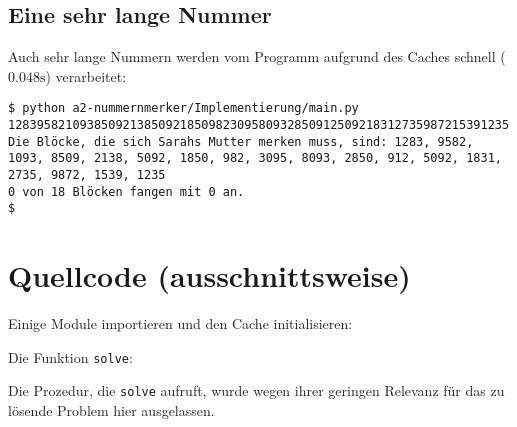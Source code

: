 \documentclass[a4paper,10pt,ngerman]{scrartcl}
\begin{document}
\subsection{Eine sehr lange Nummer}
Auch sehr lange Nummern werden vom Programm aufgrund des Caches schnell ($0.048 \text{s}$) verarbeitet:
\begin{lstlisting}
$ python a2-nummernmerker/Implementierung/main.py 1283958210938509213850921850982309580932850912509218312735987215391235
Die Blöcke, die sich Sarahs Mutter merken muss, sind: 1283, 9582, 1093, 8509, 2138, 5092, 1850, 982, 3095, 8093, 2850, 912, 5092, 1831, 2735, 9872, 1539, 1235
0 von 18 Blöcken fangen mit 0 an.
$ 
\end{lstlisting}

\section{Quellcode (ausschnittsweise)}
Einige Module importieren und den Cache initialisieren:

Die Funktion \texttt{solve}:

Die Prozedur, die \texttt{solve} aufruft, wurde wegen ihrer geringen Relevanz für das zu lösende Problem hier ausgelassen.
\end{document}
